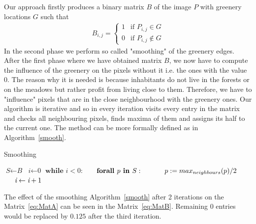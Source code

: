 \documentclass[letterpaper]{article}
\begin{document}
\indent Our approach firstly produces a binary matrix $B$ of the image $P$ with greenery locations $G$ such that
\newline
\begin{align*}
B_{i,j} = \begin{cases} 1 & \text{if } P_{i,j} \in G\\
                         0 & \text{if } P_{i,j} \notin G
\end{cases}
\end{align*}
\newline
In the second phase we perform so called "smoothing" of the greenery edges. After the first phase where we have obtained matrix $B$,
we now have to compute the influence of the greenery on the pixels without it i.e. the ones with the value 0. The reason why it is needed is
because inhabitants do not live in the forests or on the meadows but rather profit from living close to them. Therefore, we have
to "influence" pixels that are in the close neighbourhood with the greenery ones. Our algorithm is iterative and so in every iteration
visits every entry in the matrix and checks all neighbouring pixels, finds maxima of them and assigns its half to the current one.
The method can be more formally defined as in Algorithm~\ref{smooth}.

\begin{algorithm}
    \caption{Smoothing}\label{smooth}
    \begin{algorithmic}[1]
            \State $\textit{S} \gets \textit{B}$
            \State $\textit{i} \gets \textit{0}$
            \State $\textbf{while } \textit{i} < 0:$
            \State $\indent \textbf{forall } p \textbf{ in } S:$
            \State $\indent \indent p := max_{neighbours}(p) / 2$
            \State $\indent \textit{i} \gets \textit{i} + 1$
        \EndProcedure
    \end{algorithmic}
\end{algorithm}

The effect of the smoothing Algorithm~\ref{smooth} after 2 iterations on the Matrix~\ref{eq:MatA}
can be seen in the Matrix~\ref{eq:MatB}. Remaining $0$ entries would be replaced by $0.125$ after
the third iteration.
\end{document}
